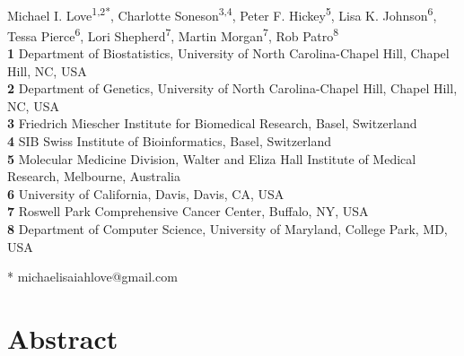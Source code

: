 \documentclass[10pt,letterpaper]{article}
\begin{document}
\vspace*{0.2in}

\begin{flushleft}
{\Large
\textbf{}
}
\newline
\\
Michael I. Love\textsuperscript{1,2*},
Charlotte Soneson\textsuperscript{3,4},
Peter F. Hickey\textsuperscript{5},
Lisa K. Johnson\textsuperscript{6},
Tessa Pierce\textsuperscript{6},
Lori Shepherd\textsuperscript{7},
Martin Morgan\textsuperscript{7},
Rob Patro\textsuperscript{8}
\\
\bigskip
\textbf{1} Department of Biostatistics, University of North Carolina-Chapel Hill, Chapel Hill, NC, USA
\\
\textbf{2} Department of Genetics, University of North Carolina-Chapel Hill, Chapel Hill, NC, USA
\\
\textbf{3} Friedrich Miescher Institute for Biomedical Research, Basel, Switzerland
\\
\textbf{4} SIB Swiss Institute of Bioinformatics, Basel, Switzerland
\\
\textbf{5} Molecular Medicine Division, Walter and Eliza Hall Institute of Medical Research, Melbourne, Australia
\\
\textbf{6} University of California, Davis, Davis, CA, USA
\\
\textbf{7} Roswell Park Comprehensive Cancer Center, Buffalo, NY, USA
\\
\textbf{8} Department of Computer Science, University of Maryland, College Park, MD, USA
\\
\bigskip

* michaelisaiahlove@gmail.com

\end{flushleft}

\section*{Abstract}
\end{document}
